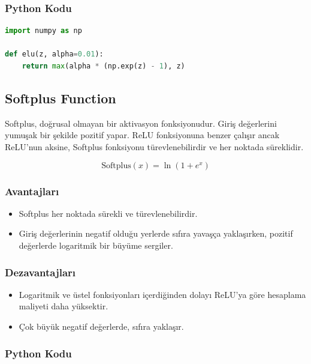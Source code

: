 \subsubsection{Python Kodu}

\begin{lstlisting}[language=Python]
import numpy as np

def elu(z, alpha=0.01):
    return max(alpha * (np.exp(z) - 1), z)
\end{lstlisting}

\newpage

\subsection{Softplus Function}

Softplus, doğrusal olmayan bir aktivasyon fonksiyonudur. Giriş değerlerini yumuşak bir şekilde pozitif yapar. ReLU fonksiyonuna benzer çalışır ancak ReLU'nun aksine, Softplus fonksiyonu türevlenebilirdir ve her noktada süreklidir.

\[ \text{Softplus}(x) = \ln(1 + e^x) \]

\subsubsection{Avantajları}

\begin{itemize}
    \item Softplus her noktada sürekli ve türevlenebilirdir.
    \item Giriş değerlerinin negatif olduğu yerlerde sıfıra yavaşça yaklaşırken, pozitif değerlerde logaritmik bir büyüme sergiler.
\end{itemize}

\subsubsection{Dezavantajları}

\begin{itemize}
    \item Logaritmik ve üstel fonksiyonları içerdiğinden dolayı ReLU'ya göre hesaplama maliyeti daha yüksektir.
    \item Çok büyük negatif değerlerde, sıfıra yaklaşır.
\end{itemize}

\subsubsection{Python Kodu}

